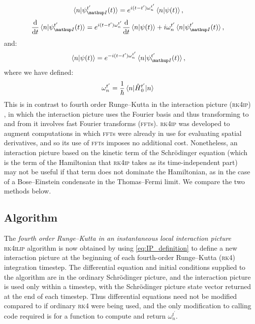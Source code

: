 \begin{align}\label{eq:IP_definition_components}
\braket{n}{\psi_\up{I}^{t^\prime}(t)} = e^{ i (t - t^\prime)\omega_n^{t^\prime}}\braket{n}{\psi(t)},
\end{align}
\begin{align}\label{eq:IPDE_components}
\dv t \braket{n}{\psi_\up{I}^{t^\prime}(t)}
    = e^{i (t - t^\prime)\omega_n^{t^\prime}}\dv t \braket{n}{\psi(t)}
      + i\omega_n^{t^\prime}\braket{n}{\psi_\up{I}^{t^\prime}(t)},
\end{align}
and:
\begin{align}\label{eq:backtransform_components}
\braket{n}{\psi(t)} = e^{-i(t - t^\prime)\omega_n^{t^\prime}}\braket{n}{\psi_\up{I}^{t^\prime}(t)},
\end{align}
where we have defined:
\begin{align}\label{eq:omega}
\omega_n^{t^\prime} = \frac 1\hbar \matrixel{n}{\hat H_0^{t^\prime}}{n}
\end{align}
This is in contrast to fourth order Runge--Kutta in the interaction picture (\textsc{rk4ip}) \cite{caradoc_davies_thesis}, in which the interaction picture uses the Fourier basis and thus transforming to and from it involves fast Fourier transforms (\textsc{fft}s). \textsc{rk4ip} was developed to augment computations in which \textsc{fft}s were already in use for evaluating spatial derivatives, and so its use of \textsc{fft}s imposes no additional cost. Nonetheless, an interaction picture based on the kinetic term of the Schr\"odinger equation (which is the term of the Hamiltonian that \textsc{rk4ip} takes as its time-independent part) may not be useful if that term does not dominate the Hamiltonian, as in the case of a Bose--Einstein condensate in the Thomas--Fermi limit. We compare the two methods below.

\subsection{Algorithm}
The \emph{fourth order Runge--Kutta in an instantaneous local interaction picture} \textsc{rk4ilip} algorithm is now obtained by using \eqref{eq:IP_definition} to define a new interaction picture at the beginning of each fourth-order Runge–Kutta (\textsc{rk4}) integration timestep. The differential equation and initial conditions supplied to the algorithm are in the ordinary Schr\"odinger picture, and the interaction picture is used only within a timestep, with the Schrödinger picture state vector returned at the end of each timestep. Thus differential equations need not be modified compared to if ordinary \textsc{rk4} were being used, and the only modification to calling code required is for a function to compute and return $\omega_n^{t^\prime}$.

